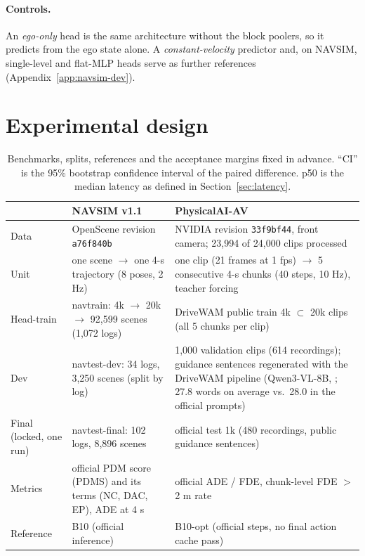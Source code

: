 \documentclass[10pt]{article}
\begin{document}
\paragraph{Controls.} An \emph{ego-only} head is the same architecture without the block poolers, so it predicts from the ego state alone. A \emph{constant-velocity} predictor and, on NAVSIM, single-level and flat-MLP heads serve as further references (Appendix~\ref{app:navsim-dev}).

\section{Experimental design}
\label{sec:setup}

\begin{table}[t]
\caption{Benchmarks, splits, references and the acceptance margins fixed in advance. ``CI'' is the 95\% bootstrap confidence interval of the paired difference. p50 is the median latency as defined in Section~\ref{sec:latency}.}
\label{tab:criteria}
\begin{center}
\small
\begin{tabular}{p{2.2cm}p{5.2cm}p{6.0cm}}
\toprule
 & NAVSIM v1.1 & PhysicalAI-AV \\
\midrule
Data & OpenScene revision \texttt{a76f840b} & NVIDIA revision \texttt{33f9bf44}, front camera; 23,994 of 24,000 clips processed \\
Unit & one scene $\rightarrow$ one 4-s trajectory (8 poses, 2 Hz) & one clip (21 frames at 1 fps) $\rightarrow$ 5 consecutive 4-s chunks (40 steps, 10 Hz), teacher forcing \\
Head-train & navtrain: 4k $\rightarrow$ 20k $\rightarrow$ 92,599 scenes (1,072 logs) & DriveWAM public train 4k $\subset$ 20k clips (all 5 chunks per clip) \\
Dev & navtest-dev: 34 logs, 3,250 scenes (split by log) & 1,000 validation clips (614 recordings); guidance sentences regenerated with the DriveWAM pipeline (Qwen3-VL-8B, \citealp{bai2025qwen3vl}; 27.8 words on average vs.\ 28.0 in the official prompts) \\
Final (locked, one run) & navtest-final: 102 logs, 8,896 scenes & official test 1k (480 recordings, public guidance sentences) \\
Metrics & official PDM score (PDMS) and its terms (NC, DAC, EP), ADE at 4 s & official ADE / FDE, chunk-level FDE $>$ 2 m rate \\
Reference & B10 (official inference) & B10-opt (official steps, no final action cache pass) \\

\end{tabular}
\end{center}
\end{table}
\end{document}

